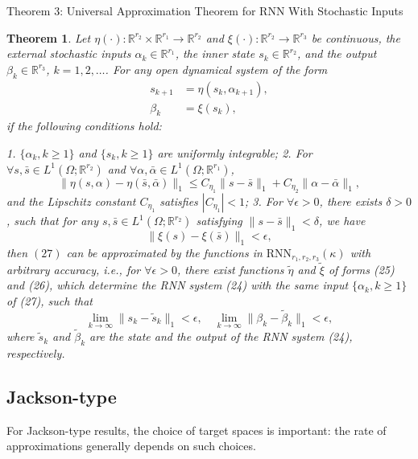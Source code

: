 \documentclass{article}
\newtheorem{theorem}{Theorem}
\theoremstyle{definition}
\theoremstyle{remark}
\begin{document}
Theorem 3: Universal Approximation Theorem for RNN With Stochastic Inputs  \citep{chen2022universal}
\begin{theorem}
Let \( \eta(\cdot) : \mathbb{R}^{r_2} \times \mathbb{R}^{r_1} \rightarrow \mathbb{R}^{r_2} \) and \( \xi(\cdot) : \mathbb{R}^{r_2} \rightarrow \mathbb{R}^{r_3} \) be continuous, the external stochastic inputs \( \alpha_k \in \mathbb{R}^{r_1} \), the inner state \( s_k \in \mathbb{R}^{r_2} \), and the output \( \beta_k \in \mathbb{R}^{r_3} \), \( k = 1, 2, \ldots \). For any open dynamical system of the form 
\[
\begin{aligned}
    s_{k+1} &= \eta(s_k, \alpha_{k+1}), \\
    \beta_k &= \xi(s_k),
\end{aligned}
\tag{27}
\]
if the following conditions hold:

1. \( \{\alpha_k, k \geq 1\} \) and \( \{s_k, k \geq 1\} \) are uniformly integrable;
2. For \( \forall s, \bar{s} \in L^1(\Omega; \mathbb{R}^{r_2}) \) and \( \forall \alpha, \bar{\alpha} \in L^1(\Omega; \mathbb{R}^{r_1}) \),
\[
\|\eta(s, \alpha) - \eta(\bar{s}, \bar{\alpha})\|_1 \leq C_{\eta_1} \|s - \bar{s}\|_1 + C_{\eta_2} \|\alpha - \bar{\alpha}\|_1,
\]
and the Lipschitz constant \( C_{\eta_1} \) satisfies \( |C_{\eta_1}| < 1 \);
3. For \( \forall \epsilon > 0 \), there exists \( \delta > 0 \), such that for any \( s, \bar{s} \in L^1(\Omega; \mathbb{R}^{r_2}) \) satisfying \( \|s - \bar{s}\|_1 < \delta \), we have
\[
\|\xi(s) - \xi(\bar{s})\|_1 < \epsilon,
\]
then \((27)\) can be approximated by the functions in \( \text{RNN}_{r_1,r_2,r_3}(\kappa) \) with arbitrary accuracy, i.e., for \( \forall \epsilon > 0 \), there exist functions \( \tilde{\eta} \) and \( \tilde{\xi} \) of forms (25) and (26), which determine the RNN system (24) with the same input \( \{\alpha_k, k \geq 1\} \) of (27), such that
\[
\lim_{k \to \infty} \|s_k - \tilde{s}_k\|_1 < \epsilon, \quad \lim_{k \to \infty} \|\beta_k - \tilde{\beta}_k\|_1 < \epsilon,
\tag{28}
\]
where \( \tilde{s}_k \) and \( \tilde{\beta}_k \) are the state and the output of the RNN system (24), respectively.
\end{theorem}
 


\subsection{Jackson-type}
For Jackson-type results, the choice of target spaces is important: the rate of approximations generally depends on such choices.
\end{document}
